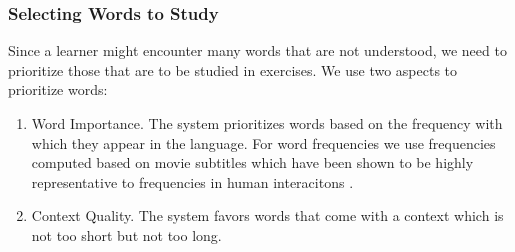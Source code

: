 \subsubsection{Selecting Words to Study}

Since a learner might encounter many words that are not understood, we need to prioritize those that are to be studied in exercises. We use two aspects to prioritize words: 


\begin{enumerate}

  \item Word Importance. The system prioritizes words based on the frequency with which they appear in the language. For word frequencies we use frequencies computed based on movie subtitles which have been shown to be highly representative to frequencies in human interacitons \cite{New07-subtitles}. 
  
  \item Context Quality. The system favors words that come with a context which is not too short but not too long. 

\end{enumerate}

